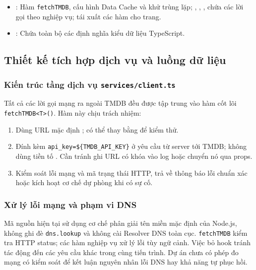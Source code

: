 \documentclass[12pt,a4paper]{extarticle}
\begin{document}
\begin{itemize}[noitemsep]
\begin{itemize}[noitemsep]
        \item {}: Chứa các Server Component kết xuất trực tiếp trên máy chủ:  (billboard banner),  (thẻ áp phích phim),  (danh sách diễn viên),  (danh sách phim tương tự),  (chân trang), cùng các skeleton loading trạng thái chờ (, ).
    \end{itemize}
    \item {}: Hàm \texttt{fetchTMDB}, cấu hình Data Cache và khử trùng lặp; , , ,  chứa các lời gọi theo nghiệp vụ;  tái xuất các hàm cho trang.
    \item {}: Chứa toàn bộ các định nghĩa kiểu dữ liệu TypeScript.
\end{itemize}

\subsection{Thiết kế tích hợp dịch vụ và luồng dữ liệu}

\subsubsection{Kiến trúc tầng dịch vụ \texttt{services/client.ts}}
Tất cả các lời gọi mạng ra ngoài TMDB đều được tập trung vào hàm cốt lõi \texttt{fetchTMDB<T>()}. Hàm này chịu trách nhiệm:
\begin{enumerate}[noitemsep]
    \item Dùng URL mặc định ; có thể thay bằng  để kiểm thử.
    \item Đính kèm \texttt{api\_key=\$\{TMDB\_API\_KEY\}} ở yêu cầu từ server tới TMDB; không dùng tiền tố . Cần tránh ghi URL có khóa vào log hoặc chuyển nó qua props.
    \item Kiểm soát lỗi mạng và mã trạng thái HTTP, trả về thông báo lỗi chuẩn xác hoặc kích hoạt cơ chế dự phòng khi có sự cố.
\end{enumerate}

\subsubsection{Xử lý lỗi mạng và phạm vi DNS}
Mã nguồn hiện tại sử dụng cơ chế phân giải tên miền mặc định của Node.js, không ghi đè \texttt{dns.lookup} và không cài Resolver DNS toàn cục. \texttt{fetchTMDB} kiểm tra HTTP status; các hàm nghiệp vụ xử lý lỗi tùy ngữ cảnh. Việc bỏ hook tránh tác động đến các yêu cầu khác trong cùng tiến trình. Dự án chưa có phép đo mạng có kiểm soát để kết luận nguyên nhân lỗi DNS hay khả năng tự phục hồi.
\end{document}
